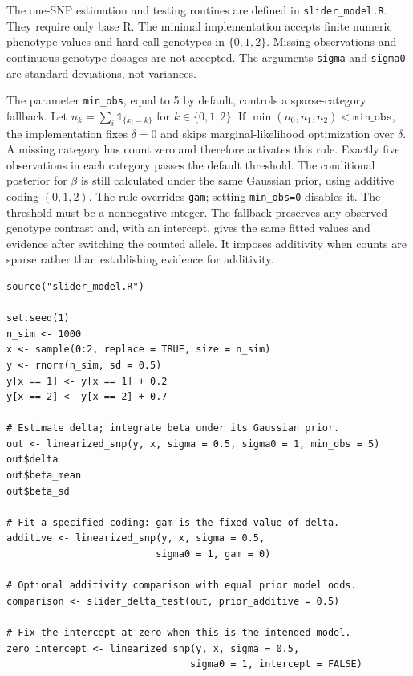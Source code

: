 \documentclass[11pt]{article}
\newcommand{\ind}{\mathbb{1}}
\begin{document}
The one-SNP estimation and testing routines are defined in
\texttt{slider\_model.R}. They require only base R. The minimal
implementation accepts finite numeric phenotype values and hard-call
genotypes in $\{0,1,2\}$. Missing observations and continuous genotype dosages are
not accepted. The arguments \texttt{sigma} and \texttt{sigma0} are
standard deviations, not variances.

The parameter \texttt{min\_obs}, equal to 5 by default, controls a
sparse-category fallback. Let $n_k=\sum_i\ind_{\{x_i=k\}}$ for
$k\in\{0,1,2\}$. If $\min(n_0,n_1,n_2)<\texttt{min\_obs}$, the
implementation fixes $\delta=0$ and skips marginal-likelihood
optimization over $\delta$. A missing category has count zero and
therefore activates this rule. Exactly five observations in each
category passes the default threshold. The conditional posterior
for $\beta$ is still calculated under the same Gaussian prior,
using additive coding $(0,1,2)$. The rule overrides \texttt{gam};
setting \texttt{min\_obs=0} disables it. The threshold must be a
nonnegative integer. The fallback preserves any observed genotype
contrast and, with an intercept, gives the same fitted values and
evidence after switching the counted allele. It imposes additivity
when counts are sparse rather than establishing evidence for additivity.

\begin{lstlisting}
source("slider_model.R")

set.seed(1)
n_sim <- 1000
x <- sample(0:2, replace = TRUE, size = n_sim)
y <- rnorm(n_sim, sd = 0.5)
y[x == 1] <- y[x == 1] + 0.2
y[x == 2] <- y[x == 2] + 0.7

# Estimate delta; integrate beta under its Gaussian prior.
out <- linearized_snp(y, x, sigma = 0.5, sigma0 = 1, min_obs = 5)
out$delta
out$beta_mean
out$beta_sd

# Fit a specified coding: gam is the fixed value of delta.
additive <- linearized_snp(y, x, sigma = 0.5,
                          sigma0 = 1, gam = 0)

# Optional additivity comparison with equal prior model odds.
comparison <- slider_delta_test(out, prior_additive = 0.5)

# Fix the intercept at zero when this is the intended model.
zero_intercept <- linearized_snp(y, x, sigma = 0.5,
                                sigma0 = 1, intercept = FALSE)
\end{lstlisting}
\end{document}

